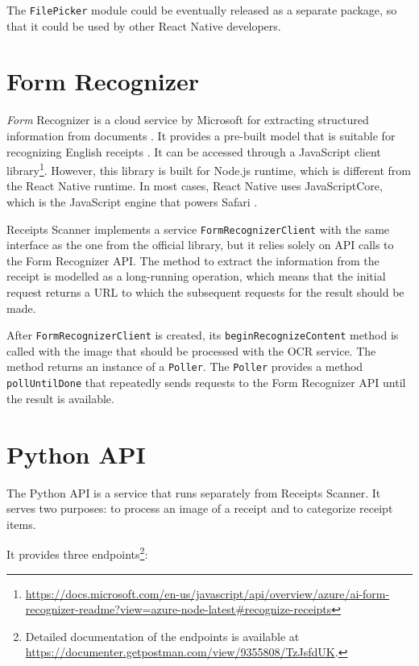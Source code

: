 \documentclass[
  digital, %
  table,   %
  oneside, %
  lof,     %
  lot,     %
]{fithesis3}
\newcommand{\definition}[1]{\textit{#1}}
\begin{document}
The \texttt{FilePicker} module could be eventually released as a separate package, so that it could be used by other React Native developers.

\section{Form Recognizer}
\label{sec:form_recognizer}
\definition{Form} Recognizer is a cloud service by Microsoft for extracting structured information from documents \cite{WhatIsFormRecognizer}. It provides a pre-built model that is suitable for recognizing English receipts \cite{FormRecognizerPrebuiltReceiptModel}. It can be accessed through a JavaScript client library\footnote{\url{https://docs.microsoft.com/en-us/javascript/api/overview/azure/ai-form-recognizer-readme?view=azure-node-latest\#recognize-receipts}}. However, this library is built for Node.js runtime, which is different from the React Native runtime. In most cases, React Native uses JavaScriptCore, which is the JavaScript engine that powers Safari \cite{JavaScriptRNEnvironment}.

Receipts Scanner implements a service \texttt{FormRecognizerClient} with the same interface as the one from the official library, but it relies solely on API calls to the Form Recognizer API. The method to extract the information from the receipt is modelled as a long-running operation, which means that the initial request returns a URL to which the subsequent requests for the result should be made.

After \texttt{FormRecognizerClient} is created, its \texttt{beginRecognizeContent} method is called with the image that should be processed with the OCR service. The method returns an instance of a \texttt{Poller}. The \texttt{Poller} provides a method \texttt{pollUntilDone} that repeatedly sends requests to the Form Recognizer API until the result is available.

\section{Python API}
\label{sec:python_api}
The Python API is a service that runs separately from Receipts Scanner. It serves two purposes: to process an image of a receipt and to categorize receipt items.

It provides three endpoints\footnote{Detailed documentation of the endpoints is available at \url{https://documenter.getpostman.com/view/9355808/TzJsfdUK}.}:
\end{document}
